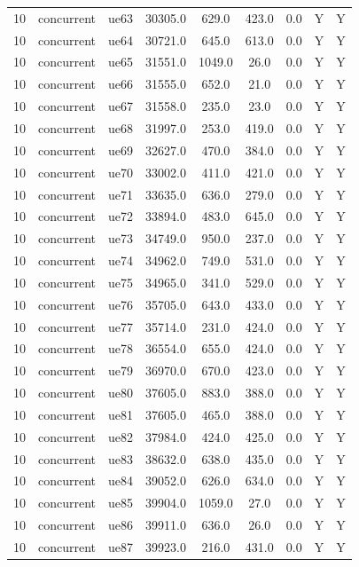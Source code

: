 \begin{table}[ht]
\begin{tabular}{|c|c|c|c|c|c|c|c|c|}
10 & concurrent & ue63 & 30305.0 & 629.0 & 423.0 & 0.0 & Y & Y \\
10 & concurrent & ue64 & 30721.0 & 645.0 & 613.0 & 0.0 & Y & Y \\
10 & concurrent & ue65 & 31551.0 & 1049.0 & 26.0 & 0.0 & Y & Y \\
10 & concurrent & ue66 & 31555.0 & 652.0 & 21.0 & 0.0 & Y & Y \\
10 & concurrent & ue67 & 31558.0 & 235.0 & 23.0 & 0.0 & Y & Y \\
10 & concurrent & ue68 & 31997.0 & 253.0 & 419.0 & 0.0 & Y & Y \\
10 & concurrent & ue69 & 32627.0 & 470.0 & 384.0 & 0.0 & Y & Y \\
10 & concurrent & ue70 & 33002.0 & 411.0 & 421.0 & 0.0 & Y & Y \\
10 & concurrent & ue71 & 33635.0 & 636.0 & 279.0 & 0.0 & Y & Y \\
10 & concurrent & ue72 & 33894.0 & 483.0 & 645.0 & 0.0 & Y & Y \\
10 & concurrent & ue73 & 34749.0 & 950.0 & 237.0 & 0.0 & Y & Y \\
10 & concurrent & ue74 & 34962.0 & 749.0 & 531.0 & 0.0 & Y & Y \\
10 & concurrent & ue75 & 34965.0 & 341.0 & 529.0 & 0.0 & Y & Y \\
10 & concurrent & ue76 & 35705.0 & 643.0 & 433.0 & 0.0 & Y & Y \\
10 & concurrent & ue77 & 35714.0 & 231.0 & 424.0 & 0.0 & Y & Y \\
10 & concurrent & ue78 & 36554.0 & 655.0 & 424.0 & 0.0 & Y & Y \\
10 & concurrent & ue79 & 36970.0 & 670.0 & 423.0 & 0.0 & Y & Y \\
10 & concurrent & ue80 & 37605.0 & 883.0 & 388.0 & 0.0 & Y & Y \\
10 & concurrent & ue81 & 37605.0 & 465.0 & 388.0 & 0.0 & Y & Y \\
10 & concurrent & ue82 & 37984.0 & 424.0 & 425.0 & 0.0 & Y & Y \\
10 & concurrent & ue83 & 38632.0 & 638.0 & 435.0 & 0.0 & Y & Y \\
10 & concurrent & ue84 & 39052.0 & 626.0 & 634.0 & 0.0 & Y & Y \\
10 & concurrent & ue85 & 39904.0 & 1059.0 & 27.0 & 0.0 & Y & Y \\
10 & concurrent & ue86 & 39911.0 & 636.0 & 26.0 & 0.0 & Y & Y \\
10 & concurrent & ue87 & 39923.0 & 216.0 & 431.0 & 0.0 & Y & Y \\

\end{tabular}
\end{table}
